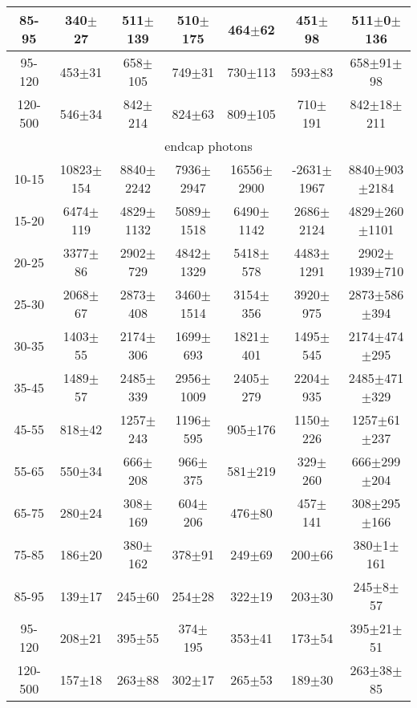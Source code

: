 \begin{table}[h]
\begin{center}
\begin{tabular}{|c|c|c|c|c|c|c|}
    85-95 & 340$\pm$27 & 511$\pm$139 & 510$\pm$175 & 464$\pm$62 & 451$\pm$98 &511$\pm$0$\pm$136  \\ \hline
    95-120 & 453$\pm$31 & 658$\pm$105 & 749$\pm$31 & 730$\pm$113 & 593$\pm$83 &658$\pm$91$\pm$98  \\ \hline
    120-500 & 546$\pm$34 & 842$\pm$214 & 824$\pm$63 & 809$\pm$105 & 710$\pm$191 &842$\pm$18$\pm$211  \\ \hline
    \multicolumn{7}{|c|}{endcap photons} \\ \hline
     10-15 & 10823$\pm$154 & 8840$\pm$2242 & 7936$\pm$2947 & 16556$\pm$2900 & -2631$\pm$1967 &8840$\pm$903$\pm$2184  \\ \hline
    15-20 & 6474$\pm$119 & 4829$\pm$1132 & 5089$\pm$1518 & 6490$\pm$1142 & 2686$\pm$2124 &4829$\pm$260$\pm$1101  \\ \hline
    20-25 & 3377$\pm$86 & 2902$\pm$729 & 4842$\pm$1329 & 5418$\pm$578 & 4483$\pm$1291 &2902$\pm$1939$\pm$710  \\ \hline
    25-30 & 2068$\pm$67 & 2873$\pm$408 & 3460$\pm$1514 & 3154$\pm$356 & 3920$\pm$975 &2873$\pm$586$\pm$394  \\ \hline
    30-35 & 1403$\pm$55 & 2174$\pm$306 & 1699$\pm$693 & 1821$\pm$401 & 1495$\pm$545 &2174$\pm$474$\pm$295  \\ \hline
    35-45 & 1489$\pm$57 & 2485$\pm$339 & 2956$\pm$1009 & 2405$\pm$279 & 2204$\pm$935 &2485$\pm$471$\pm$329  \\ \hline
    45-55 & 818$\pm$42 & 1257$\pm$243 & 1196$\pm$595 & 905$\pm$176 & 1150$\pm$226 &1257$\pm$61$\pm$237  \\ \hline
    55-65 & 550$\pm$34 & 666$\pm$208 & 966$\pm$375 & 581$\pm$219 & 329$\pm$260 &666$\pm$299$\pm$204  \\ \hline
    65-75 & 280$\pm$24 & 308$\pm$169 & 604$\pm$206 & 476$\pm$80 & 457$\pm$141 &308$\pm$295$\pm$166  \\ \hline
    75-85 & 186$\pm$20 & 380$\pm$162 & 378$\pm$91 & 249$\pm$69 & 200$\pm$66 &380$\pm$1$\pm$161  \\ \hline
    85-95 & 139$\pm$17 & 245$\pm$60 & 254$\pm$28 & 322$\pm$19 & 203$\pm$30 &245$\pm$8$\pm$57  \\ \hline
    95-120 & 208$\pm$21 & 395$\pm$55 & 374$\pm$195 & 353$\pm$41 & 173$\pm$54 &395$\pm$21$\pm$51  \\ \hline
    120-500 & 157$\pm$18 & 263$\pm$88 & 302$\pm$17 & 265$\pm$53 & 189$\pm$30 &263$\pm$38$\pm$85  \\ \hline
  \end{tabular}
  \label{tab:diff_ways_to_fit_phoEt_muon}
  \end{center}
\end{table}

